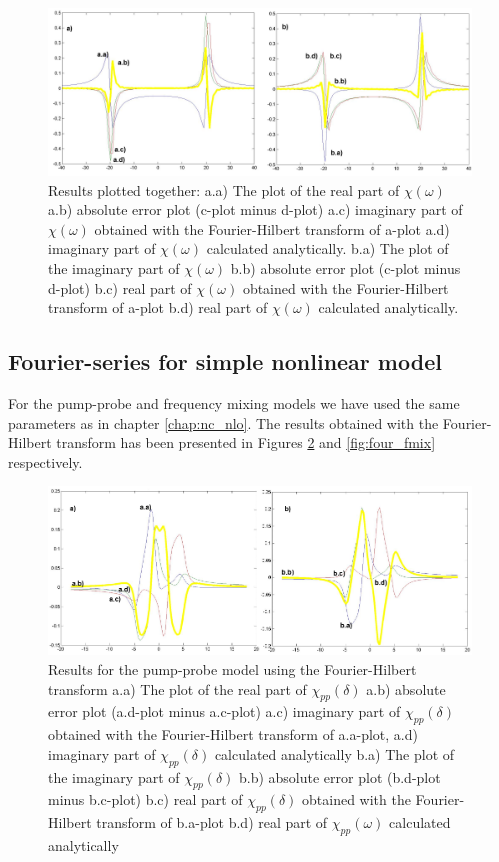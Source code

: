 \documentclass[12pt,twoside,a4paper]{article}
\numberwithin{equation}{subsection}
\numberwithin{figure}{subsection}
\begin{document}
\begin{figure} 
  \includegraphics[width=150mm]{img/four_lin.png}
  \caption{Results plotted together: 
   a.a) The plot of the real part of $\chi (\omega )$ 
   a.b) absolute error plot (c-plot minus d-plot) 
   a.c) imaginary part of $\chi (\omega )$ obtained with the Fourier-Hilbert transform of a-plot 
   a.d) imaginary part of $\chi (\omega )$  calculated analytically. 
   b.a) The plot of the imaginary part of $\chi (\omega )$ 
   b.b) absolute error plot (c-plot minus d-plot) 
   b.c) real part of $\chi (\omega )$ obtained with the Fourier-Hilbert transform of a-plot 
   b.d) real part of $\chi (\omega )$ calculated analytically. \label{fig:four_lin}
  }
\end{figure} 

\subsection{Fourier-series for simple nonlinear model} \label{chap:fourier_nlo}

For the pump-probe and frequency mixing models we have used the same parameters as in chapter \ref{chap:nc_nlo}. The results
obtained with the Fourier-Hilbert transform has been presented in Figures \ref{fig:four_pnp} and \ref{fig:four_fmix}
respectively.

\begin{figure} 
  \includegraphics[width=150mm]{img/four_pnp.png}
  \caption{Results for the pump-probe model using the Fourier-Hilbert transform
     a.a) The plot of the real part of ${\chi_{pp}}(\delta )$
     a.b) absolute error plot (a.d-plot minus a.c-plot)
     a.c) imaginary part of ${\chi_{pp}}(\delta )$ obtained with the Fourier-Hilbert transform of a.a-plot, 
     a.d) imaginary part of ${\chi_{pp}}(\delta )$ calculated analytically 
     b.a) The plot of the imaginary part of ${\chi_{pp}}(\delta )$ 
     b.b) absolute error plot (b.d-plot minus b.c-plot)
     b.c) real part of ${\chi_{pp}}(\delta )$ obtained with the Fourier-Hilbert transform of b.a-plot 
     b.d) real part of $\chi_{pp} (\omega )$ calculated analytically 
     \label{fig:four_pnp}
     }
\end{figure} 
\end{document}
